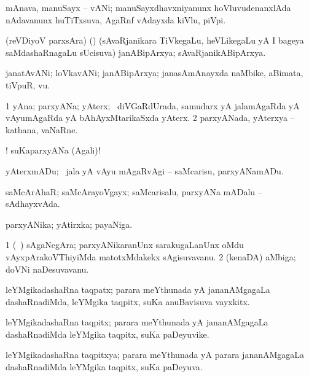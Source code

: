 \bentry 
{} 
\gl{\nA}
\expl{\Latin}
\bmng
mAnava, manuSayx -- vANi; manuSayxdhavxniyanunx hoVluvudenanxlAda nAdavanunx huTiTxsuva, AgaRnf vAdayxda kiVlu, piVpi. 
\emng
\eentry

\bentry 
{} 
\gl{\nA}
\expl{}
\bmng
 (reVDiyoV parxsAra) (\AmA) (sAvaRjanikara TiVkegaLu, heVLikegaLu yA I bageya saMdashaRnagaLu sUcisuva) janABipArxya; sAvaRjanikABipArxya. 
\emng
\eentry

\bentry 
{} 
\gl{\nA}
\expl{\Latin}
\bmng
janatAvANi; loVkavANi; janABipArxya; janasAmAnayxda naMbike, aBimata, tiVpuR, \mo vu. 
\emng
\eentry

\bentry
{} 
\gl{\nA}
\expl{}
\bmng
\bnum
\num{1} yAna; parxyANa; yAterx; \kanmu\ diVGaRdUrada, samudarx yA jalamAgaRda yA vAyumAgaRda yA bAhAyxMtarikaSxda yAterx. 
\num{2} parxyANada, yAterxya -- kathana, vaNaRne. 
\enum
\emng

\noindent 
\gl{\pagu}
\expl{}
\bmng
{}! suKaparxyANa (Agali)! 
\emng
\eentry

\bentry
{} 
\gl{\sakirx}
\expl{}
\bmng
 yAterxmADu; \kanmu\ jala yA vAyu mAgaRvAgi -- saMcarisu, parxyANamADu. 
\emng
\eentry

\bentry 
{} 
\gl{\gu}
\expl{}
\bmng
 saMcArAhaR; saMcArayoVgayx; saMcarisalu, parxyANa mADalu -- sAdhayxvAda. 
\emng
\eentry

\bentry 
{} 
\gl{\nA}
\expl{}
\bmng
 parxyANika; yAtirxka; payaNiga. 
\emng
\eentry

\bentry 
{} 
\gl{\nA}
\expl{}
\bmng
\bnum
\num{1} (\kanmu\ \ca) sAgaNegAra; parxyANikaranUnx sarakugaLanUnx oMdu vAyxpArakoVThiyiMda matotxMdakekx sAgisuvavanu. 
\num{2} (kenaDA) aMbiga; doVNi naDesuvavanu. 
\enum
\emng
\eentry

\bentry
{} 
\gl{\nA}
\expl{}
\bmng
 leYMgikadashaRna taqpatx; parara meYthunada yA jananAMgagaLa dashaRnadiMda, leYMgika taqpitx, suKa anuBavisuva vayxkitx. 
\emng
\eentry

\bentry 
{} 
\gl{\nA}
\expl{}
\bmng
 leYMgikadashaRna taqpitx; parara meYthunada yA jananAMgagaLa dashaRnadiMda leYMgika taqpitx, suKa paDeyuvike. 
\emng
\eentry

\bentry
{} 
\gl{\gu}
\expl{}
\bmng
 leYMgikadashaRna taqpitxya; parara meYthunada yA parara jananAMgagaLa dashaRnadiMda leYMgika taqpitx, suKa paDeyuva. 
\emng
\eentry

